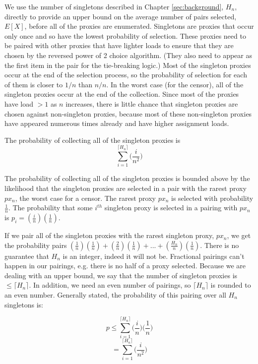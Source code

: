 We use the number of singletons described in Chapter \ref{sec:background}, $H_n$, directly to provide an upper bound on the average number of pairs selected, $E[X]$, before all of the proxies are enumerated. Singletons are proxies that occur only once and so have the lowest probability of selection. These proxies need to be paired with other proxies that have lighter loads to ensure that they are chosen by the reversed power of 2 choice algorithm. (They also need to appear as the first item in the pair for the tie-breaking logic.) Most of the singleton proxies occur at the end of the selection process, so the probability of selection for each of them is closer to $1/n$ than $n/n$. In the worst case (for the censor), all of the singleton proxies occur at the end of the collection. Since most of the proxies have load $> 1$ as $n$ increases, there is little chance that singleton proxies are chosen against non-singleton proxies, because most of these non-singleton proxies have appeared numerous times already and have higher assignment loads.

\begin{lemma}{The probability of collecting all of the singleton proxies is \\
$$\sum_{i=1}^{\lceil{H_n}\rceil} \bigg(\frac{i}{n^2}\bigg)$$}

The probability of collecting all of the singleton proxies is bounded above by the likelihood that the singleton proxies are selected in a pair with the rarest proxy $px_n$, the worst case for a censor. The rarest proxy $px_n$ is selected with probability $\frac{1}{n}$. The probability that some $i^{th}$ singleton proxy is selected in a pairing with $px_n$ is $p_i = (\frac{i}{n})(\frac{1}{n})$. 

If we pair all of the singleton proxies with the rarest singleton proxy, $px_n$, we get the probability pairs $(\frac{1}{n})(\frac{1}{n}) + (\frac{2}{n})(\frac{1}{n}) + ... + (\frac{H_n}{n})(\frac{1}{n})$. There is no guarantee that $H_n$ is an integer, indeed it will not be. Fractional pairings can't happen in our pairings, e.g. there is no half of a proxy selected. Because we are dealing with an upper bound, we say that the number of singleton proxies is $\leq \lceil{H_n}\rceil$. In addition, we need an even number of pairings, so $\lceil{H_n}\rceil$ is rounded to an even number. Generally stated, the probability of this pairing over all $H_n$ singletons is:

$$p \leq \sum_{i=1}^{\lceil{H_n}\rceil} \bigg(\frac{i}{n}\bigg) \bigg(\frac{1}{n}\bigg)$$
$$= \sum_{i=1}^{\lceil{H_n}\rceil} \bigg(\frac{i}{n^2}\bigg)$$

\end{lemma}

